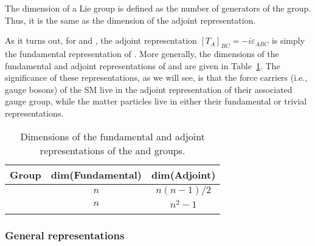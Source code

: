 \begin{definition}
\label{def:01_lie_group_dim}
The dimension of a Lie group is defined as the number of generators of the group.
Thus, it is the same as the dimension of the adjoint representation.
\end{definition}

As it turns out, for \so[3] and \su[2], the adjoint representation $[T_A]_{BC} = -i \varepsilon_{ABC}$ is simply the fundamental representation of \so[3].
More generally, the dimensions of the fundamental and adjoint representations of \SO[n] and \SU[n] are given in Table~\ref{tab:01_so_su_dimensions}.
The significance of these representations, as we will see, is that the force carriers (i.e., gauge bosons) of the SM live in the adjoint representation of their associated gauge group, while the matter particles live in either their fundamental or trivial representations.

\begin{table}[ht!]
	\centering
	\caption{Dimensions of the fundamental and adjoint representations of the \SO[n] and \SU[n] groups.}
	\renewcommand{\arraystretch}{1.5}
	\setlength{\tabcolsep}{10pt}
	\begin{tabular}{ccc}
		\toprule
		\textbf{Group} & \textbf{dim(Fundamental)} & \textbf{dim(Adjoint)} \\
		\midrule
		\SO[n] & $n$ & $n(n-1)/2$ \\
		\SU[n] & $n$ & $n^2 - 1$ \\
		\cbottomrule
	\end{tabular}
	\label{tab:01_so_su_dimensions}
\end{table}

\subsubsection{General representations}

